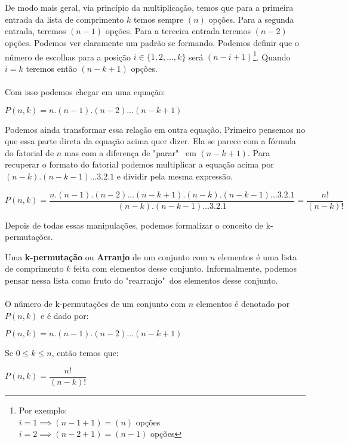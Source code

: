 \documentclass[main.tex]{subfiles}
\begin{document}
\\~\\
De modo mais geral, via princípio da multiplicação, temos que para a primeira entrada da lista de comprimento $k$ temos sempre $(n)$ opções. Para a segunda entrada, teremos $(n - 1)$ opções. Para a terceira entrada teremos $(n - 2)$ opções. Podemos ver claramente um padrão se formando. Podemos definir que o número de escolhas para a posição $i \in \{1,2,\dots,k\}$ será $(n - i + 1)$\footnote{Por exemplo: \\ $i = 1 \implies (n - 1 + 1) = (n)$ opções \\ $i = 2 \implies (n - 2 + 1) = (n - 1)$ opções}. Quando $i = k$ teremos então $(n - k + 1)$ opções.
\\~\\
Com isso podemos chegar em uma equação:
\begin{center}
$ P(n,k) = n . (n - 1) . (n - 2) \dots (n - k + 1) $
\end{center}

Podemos ainda transformar essa relação em outra equação. Primeiro pensemos no que essa parte direta da equação acima quer dizer. Ela se parece com a fórmula do fatorial de $n$ mas com a diferença de "parar" \ em $(n - k + 1)$. Para recuperar o formato do fatorial podemos multiplicar a equação acima por $ (n - k) . (n - k - 1) \dots 3 . 2 . 1 $ e dividir pela mesma expressão.

\begin{center}
\small $ P(n,k) = \dfrac{n . (n - 1) . (n - 2) \dots (n - k + 1) . (n - k) . (n - k - 1) \dots 3 . 2 . 1}{(n - k) . (n - k - 1) \dots 3 . 2 . 1} = \dfrac{n!}{(n-k)!}$
\end{center}

Depois de todas essas manipulações, podemos formalizar o conceito de k-permutações.

\begin{fact}
Uma \textbf{k-permutação} ou \textbf{Arranjo} de um conjunto com $n$ elementos é uma lista de comprimento $k$ feita com elementos desse conjunto. Informalmente, podemos pensar nessa lista como fruto do "rearranjo"\ dos elementos desse conjunto.
\\~\\
O número de k-permutações de um conjunto com $n$ elementos é denotado por $P(n,k)$ e é dado por:\\
\begin{center}
$ P(n,k) = n . (n - 1) . (n - 2) \dots (n - k + 1) $
\end{center}

Se $0 \leq k \leq n$, então temos que:\\
\begin{center}
 $ P(n,k) = \dfrac{n!}{(n - k)!} $
\end{center}
\end{fact}
\end{document}
